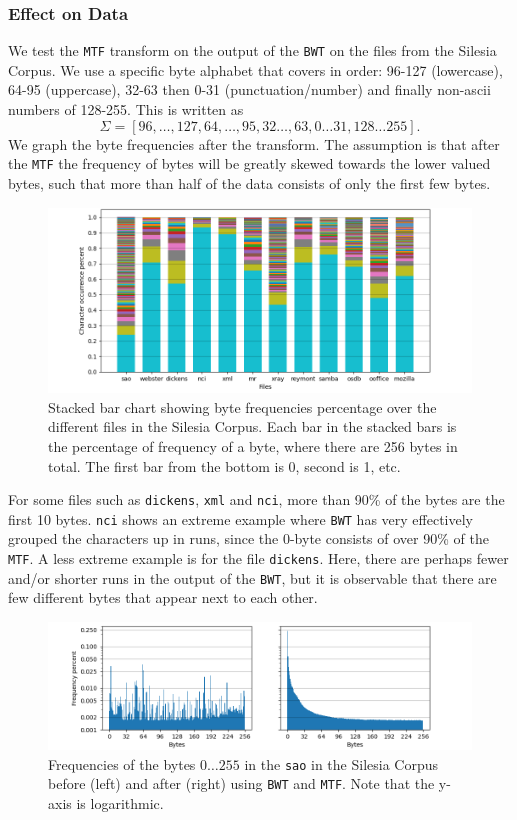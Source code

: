 \documentclass{article}
\begin{document}
\subsubsection{Effect on Data}
We test the \texttt{MTF} transform on the output of the \texttt{BWT} on the files from the Silesia Corpus. We use a specific byte alphabet that covers in order: 96-127 (lowercase), 64-95 (uppercase), 32-63 then 0-31 (punctuation/number) and finally non-ascii numbers of 128-255. This is written as 
\[
    \Sigma = [96, \dots , 127, 64, \dots , 95, 32 \dots, 63, 0 \dots 31, 128 \dots 255].
\] 
We graph the byte frequencies after the transform. The assumption is that after the \texttt{MTF} the frequency of bytes will be greatly skewed towards the lower valued bytes, such that more than half of the data consists of only the first few bytes.
\begin{figure}[H]
    \centering
    \includegraphics[width=\textwidth]{images/mtfGraphFreq.png}
    \caption{Stacked bar chart showing byte frequencies percentage over the different files in the Silesia Corpus. Each bar in the stacked bars is the percentage of frequency of a byte, where there are 256 bytes in total. The first bar from the bottom is 0, second is 1, etc.}
    \label{MTFFreq}
\end{figure}
For some files such as \texttt{dickens}, \texttt{xml} and \texttt{nci}, more than 90\% of the bytes are the first 10 bytes. \texttt{nci} shows an extreme example where \texttt{BWT} has very effectively grouped the characters up in runs, since the 0-byte consists of over 90\% of the \texttt{MTF}. A less extreme example is for the file \texttt{dickens}. Here, there are perhaps fewer and/or shorter runs in the output of the \texttt{BWT}, but it is observable that there are few different bytes that appear next to each other.
\begin{figure}[H]
    \centering
    \includegraphics[width=\textwidth]{images/saoCharFreq.png}
    \caption{Frequencies of the bytes \(0 \dots 255\) in the \texttt{sao} in the Silesia Corpus before (left) and after (right) using \texttt{BWT} and \texttt{MTF}. Note that the y-axis is logarithmic.}
\end{figure}
\end{document}
